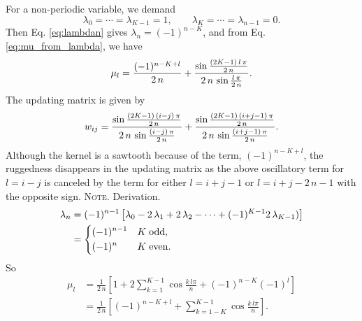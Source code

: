 \documentclass[reprint, superscriptaddress, floatfix]{revtex4-1}
\newcommand{\note}[1]{{\color{DarkGreen}\footnotesize \textsc{Note.} #1}}
\begin{document}
For a non-periodic variable, we demand
$$
\lambda_0 = \cdots = \lambda_{K-1} = 1,
\qquad
\lambda_K = \cdots = \lambda_{n-1} = 0.
$$
Then Eq. \eqref{eq:lambdan} gives
$\lambda_n = (-1)^{n-K}$,
and from Eq. \eqref{eq:mu_from_lambda},
we have
\begin{equation}
  \mu_l
  =
  \frac{ (-1)^{n-K+l} } { 2 \, n }
    +
  \frac{
    \sin
    \frac{ (2 K - 1) \, l \, \pi }
         {         2 \, n        }
  }
  {
    2 \, n \, \sin \frac{ l \, \pi } { 2 \, n }
  }
  .
  \notag
\end{equation}
%
The updating matrix is given by
%
\begin{equation}
  w_{ij}
  =
    \frac{
      \sin
      \frac{ (2 K - 1) \, (i-j) \, \pi }
           {         2 \, n        }
    }
    {
      2 \, n \, \sin \frac{ (i-j) \, \pi } { 2 \, n }
    }
    +
    \frac{
      \sin
      \frac{ (2 K - 1) \, (i+j-1) \, \pi }
           {         2 \, n        }
    }
    {
      2 \, n \, \sin \frac{ (i+j-1) \, \pi } { 2 \, n }
    }
  .
  \notag
\end{equation}
%
Although the kernel is a sawtooth
because of the term, $(-1)^{n-K+l}$,
the ruggedness disappears
in the updating matrix
as the above oscillatory term for $l = i - j$
is canceled by the term for either $l = i + j - 1$
or $l = i + j - 2 \, n - 1$
with the opposite sign.
%
\note{Derivation.
$$
\begin{aligned}
  \lambda_{n}
  &=
  (-1)^{n-1}
  \left[
    \lambda_0
    - 2 \, \lambda_1
    + 2 \, \lambda_2 - \cdots
    + (-1)^{K-1} 2 \, \lambda_{K-1})
  \right]
  \\
  &=
  \begin{dcases}
    (-1)^{n-1} & K \mathrm{\; odd,} \\
    (-1)^n     & K \mathrm{\; even.}
  \end{dcases}
\end{aligned}
$$
So
$$
\begin{aligned}
  \mu_l
  &=
  \frac{1}{2\,n}
  \left[
    1 +
    2 \sum_{k=1}^{K-1}
    \cos \frac { k \, l \pi } { n }
    +
    (-1)^{n-K} (-1)^l
  \right]
  \\
  &=
  \frac{1}{2\,n}
  \left[
    (-1)^{n-K+l}
    +
    \sum_{k=1-K}^{K-1}
    \cos \frac { k \, l \pi } { n }
  \right]
  .
\end{aligned}
$$
}%
\end{document}
